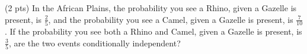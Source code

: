 \documentclass[twoside,12pt]{article}
\begin{document}
\begin{probset}
\begin{prob}[(11 pts)]
\begin{subprobset}
\begin{subprob}
\begin{responsebox}{0.9in}
        \end{responsebox}
    \end{subprob}

    \begin{subprob}(2 pts)
        In the African Plains, the probability you see a Rhino, given a Gazelle is present, is $\frac{2}{5}$, and the probability you see a Camel, given a Gazelle is present, is $\frac{7}{10}$. If the probability you see both a Rhino and Camel, given a Gazelle is present, is $\frac{3}{5}$, are the two events conditionally independent?

        \begin{center}        
        \end{center}
    \end{subprob}
\end{subprobset}




    
\end{prob}


\end{probset}
\end{document}
